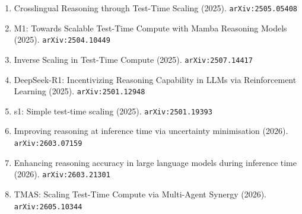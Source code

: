 \documentclass[11pt]{article}
\begin{document}
\begin{enumerate}
  \item Crosslingual Reasoning through Test-Time Scaling (2025). \texttt{arXiv:2505.05408}
  \item M1: Towards Scalable Test-Time Compute with Mamba Reasoning Models (2025). \texttt{arXiv:2504.10449}
  \item Inverse Scaling in Test-Time Compute (2025). \texttt{arXiv:2507.14417}
  \item DeepSeek-R1: Incentivizing Reasoning Capability in LLMs via Reinforcement Learning (2025). \texttt{arXiv:2501.12948}
  \item s1: Simple test-time scaling (2025). \texttt{arXiv:2501.19393}
  \item Improving reasoning at inference time via uncertainty minimisation (2026). \texttt{arXiv:2603.07159}
  \item Enhancing reasoning accuracy in large language models during inference time (2026). \texttt{arXiv:2603.21301}
  \item TMAS: Scaling Test-Time Compute via Multi-Agent Synergy (2026). \texttt{arXiv:2605.10344}
\end{enumerate}
\end{document}

